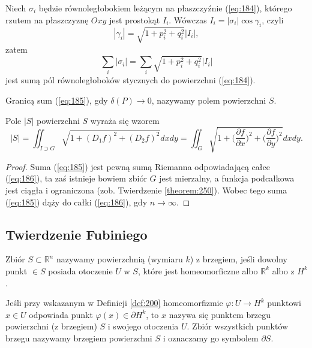 \documentclass[leqno]{article}
\newcounter{defcounter}
\newcounter{uwagacounter}
\begin{document}
\begin{justify}
Niech $\sigma_i$ będzie równoległobokiem leżącym na płaszczyźnie (\ref{eq:184}), którego rzutem na płaszczyznę $Oxy$ jest prostokąt $I_i$. Wówczas 
$I_i = |\sigma_i| \cos \gamma_i$, czyli 
\[
    |\gamma_i| = \sqrt{1 + p_i^2 + q_i^2}|I_i|,
\]
zatem
\begin{equation}\label{eq:185}
    \sum_{i} |\sigma_i| = \sum_{i}\sqrt{1 + p_i^2 + q_i^2}|I_i|
\end{equation}
jest sumą pól równoległoboków stycznych do powierzchni (\ref{eq:184}).

\begin{defn}
    Granicą sum (\ref{eq:185}), gdy $\delta(P) \to 0$, nazywamy polem powierzchni $S$.
\end{defn}

\begin{theorem}
{
    Pole $|S|$ powierzchni $S$ wyraża się wzorem 
    \begin{equation}\label{eq:186}
        |S| = \iint_{I \supset G}\sqrt{1 + (D_1 f)^2 + (D_2 f)^2} dxdy = \iint_{G}\sqrt{1 + \Big(\frac{\partial f}{\partial x}\Big)^2 + \Big(\frac{\partial f}{\partial y}\Big)^2}dxdy.
    \end{equation}
}
\end{theorem}

\begin{proof}
    Suma (\ref{eq:185}) jest pewną sumą Riemanna odpowiadającą całce (\ref{eq:186}), ta zaś istnieje bowiem zbiór $G$ jest mierzalny,
    a funkcja podcałkowa jest ciągła i ograniczona (zob. Twierdzenie \ref{theorem:250}). 
    Wobec tego suma (\ref{eq:185}) dąży do całki (\ref{eq:186}), gdy $n \to \infty$.
\end{proof}

\subsection{Twierdzenie Fubiniego}





\newpage

\setcounter{defcounter}{199}
\setcounter{uwagacounter}{104}

\begin{defn}
    Zbiór $S \subset \mathbb{R}^n$ nazywamy powierzchnią (wymiaru $k$) z brzegiem, jeśli dowolny punkt $ \in S$ posiada otoczenie $U$ w $S$,
    które jest homeomorficzne albo $\mathbb{R}^k$ albo z $H^k$. 
\end{defn}

\begin{defn}
    Jeśli przy wskazanym w Definicji \ref{def:200} homeomorfizmie $\varphi : U \to H^k$ punktowi $x \in U$ odpowiada punkt $\varphi(x) \in \partial H^k$, to 
    $x$ nazywa się punktem brzegu powierzchni (z brzegiem) $S$ i swojego otoczenia $U$. Zbiór wszystkich punktów brzegu nazywamy brzegiem powierzchni $S$ 
    i oznaczamy go symbolem $\partial S$. 
\end{defn}


\end{justify}
\end{document}
